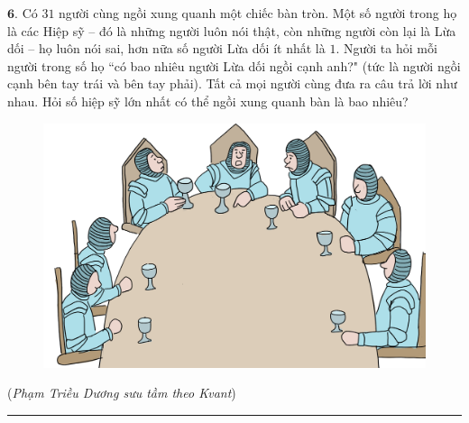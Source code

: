 \begin{multicols}{2}
\begin{figure}[H]
		\vspace*{-15pt}
	\end{figure}
	$\pmb{6.}$ Có $31$ người cùng ngồi xung quanh một chiếc bàn tròn. Một số người trong họ là các Hiệp sỹ -- đó là những người luôn nói thật, còn những người còn lại là Lừa dối -- họ luôn nói sai, hơn nữa số người Lừa dối ít nhất là $1$. Người ta hỏi mỗi người trong số họ ``có bao nhiêu người Lừa dối ngồi cạnh anh?" (tức là người ngồi cạnh bên tay trái và bên tay phải). Tất cả mọi người cùng đưa ra câu trả lời như nhau. Hỏi số hiệp sỹ lớn nhất có thể ngồi xung quanh bàn là bao nhiêu?
	\begin{figure}[H]
		\vspace*{5pt}
		\centering
		\captionsetup{labelformat= empty, justification=centering}
		\includegraphics[width= 0.95\linewidth]{bai6}
		\vspace*{-15pt}
	\end{figure}
	\hfill (\textit{Phạm Triều Dương sưu tầm theo Kvant})
\end{multicols}
\vspace*{-10pt}
\rule{1\linewidth}{0.1pt}
\begingroup
